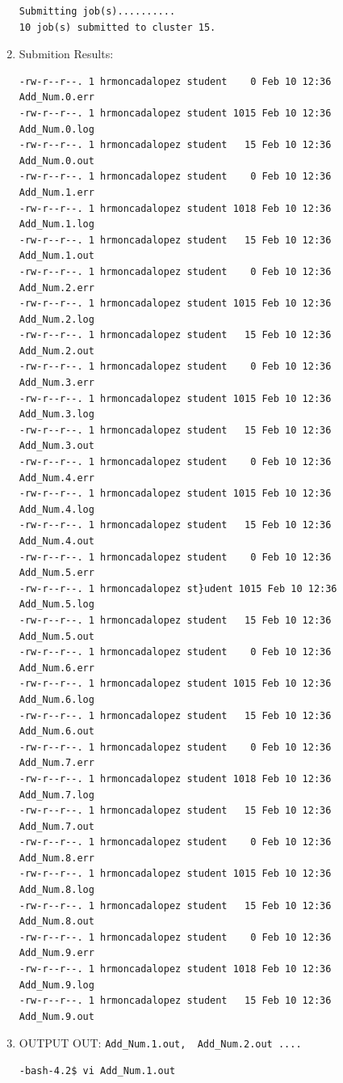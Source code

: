 \documentclass{article}
\begin{document}
\begin{enumerate}
\begin{verbatim}
Submitting job(s)..........
10 job(s) submitted to cluster 15.
\end{verbatim}
\normalsize
\item Submition Results:
\scriptsize\begin{verbatim}
-rw-r--r--. 1 hrmoncadalopez student    0 Feb 10 12:36 Add_Num.0.err
-rw-r--r--. 1 hrmoncadalopez student 1015 Feb 10 12:36 Add_Num.0.log
-rw-r--r--. 1 hrmoncadalopez student   15 Feb 10 12:36 Add_Num.0.out
-rw-r--r--. 1 hrmoncadalopez student    0 Feb 10 12:36 Add_Num.1.err
-rw-r--r--. 1 hrmoncadalopez student 1018 Feb 10 12:36 Add_Num.1.log
-rw-r--r--. 1 hrmoncadalopez student   15 Feb 10 12:36 Add_Num.1.out
-rw-r--r--. 1 hrmoncadalopez student    0 Feb 10 12:36 Add_Num.2.err
-rw-r--r--. 1 hrmoncadalopez student 1015 Feb 10 12:36 Add_Num.2.log
-rw-r--r--. 1 hrmoncadalopez student   15 Feb 10 12:36 Add_Num.2.out
-rw-r--r--. 1 hrmoncadalopez student    0 Feb 10 12:36 Add_Num.3.err
-rw-r--r--. 1 hrmoncadalopez student 1015 Feb 10 12:36 Add_Num.3.log
-rw-r--r--. 1 hrmoncadalopez student   15 Feb 10 12:36 Add_Num.3.out
-rw-r--r--. 1 hrmoncadalopez student    0 Feb 10 12:36 Add_Num.4.err
-rw-r--r--. 1 hrmoncadalopez student 1015 Feb 10 12:36 Add_Num.4.log
-rw-r--r--. 1 hrmoncadalopez student   15 Feb 10 12:36 Add_Num.4.out
-rw-r--r--. 1 hrmoncadalopez student    0 Feb 10 12:36 Add_Num.5.err
-rw-r--r--. 1 hrmoncadalopez st}udent 1015 Feb 10 12:36 Add_Num.5.log
-rw-r--r--. 1 hrmoncadalopez student   15 Feb 10 12:36 Add_Num.5.out
-rw-r--r--. 1 hrmoncadalopez student    0 Feb 10 12:36 Add_Num.6.err
-rw-r--r--. 1 hrmoncadalopez student 1015 Feb 10 12:36 Add_Num.6.log
-rw-r--r--. 1 hrmoncadalopez student   15 Feb 10 12:36 Add_Num.6.out
-rw-r--r--. 1 hrmoncadalopez student    0 Feb 10 12:36 Add_Num.7.err
-rw-r--r--. 1 hrmoncadalopez student 1018 Feb 10 12:36 Add_Num.7.log
-rw-r--r--. 1 hrmoncadalopez student   15 Feb 10 12:36 Add_Num.7.out
-rw-r--r--. 1 hrmoncadalopez student    0 Feb 10 12:36 Add_Num.8.err
-rw-r--r--. 1 hrmoncadalopez student 1015 Feb 10 12:36 Add_Num.8.log
-rw-r--r--. 1 hrmoncadalopez student   15 Feb 10 12:36 Add_Num.8.out
-rw-r--r--. 1 hrmoncadalopez student    0 Feb 10 12:36 Add_Num.9.err
-rw-r--r--. 1 hrmoncadalopez student 1018 Feb 10 12:36 Add_Num.9.log
-rw-r--r--. 1 hrmoncadalopez student   15 Feb 10 12:36 Add_Num.9.out
\end{verbatim}
\normalsize
\item OUTPUT OUT: \verb+Add_Num.1.out,  Add_Num.2.out ....+
\scriptsize\begin{verbatim}
-bash-4.2$ vi Add_Num.1.out


\end{verbatim}
\end{enumerate}
\end{document}
